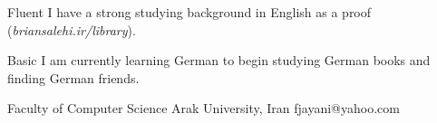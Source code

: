 \documentclass[a4paper,12pt]{memoir} %
\begin{document}


{Fluent}
{I have a strong studying background in English as a proof (\textit{briansalehi.ir/library}).}

{Basic}
{I am currently learning German to begin studying German books and finding German friends.}


\Sep %




{Faculty of Computer Science}
{Arak University, Iran}
{fjayani@yahoo.com}


\Sep %
\end{document}
